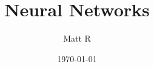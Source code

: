 \documentclass[12pt]{article}
\title{Neural Networks}
\author{Matt R}
\date{\today}
\numberwithin{equation}{section}%
\begin{document}
	\maketitle
	\tableofcontents

	



	\begin{comment}
	\begin{appendices}
		
		

	\end{appendices}
	\end{comment}


\end{document}
